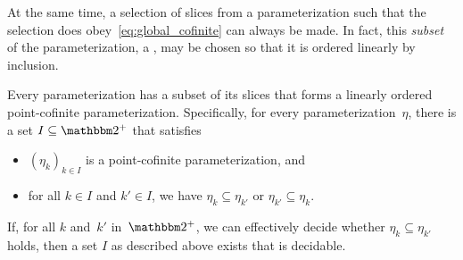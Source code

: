 At the same time, a selection of slices from a parameterization such that the selection does obey~\eqref{eq:global_cofinite} can always be made.
In fact, this \emph{subset} of the parameterization, a , may be chosen so that it is ordered linearly by inclusion.
\begin{lemma}
\label{lem:cofinal_chain}%
  Every parameterization has a subset of its slices that forms a linearly ordered point-cofinite parameterization.
  Specifically, for every parameterization~$\eta$, there is a set $I \subseteq \binary^+$ that satisfies
  \begin{itemize}
  \item $(\eta_k)_{k \in I}$ is a point-cofinite parameterization, and
  \item for all $k \in I$ and $k' \in I$, we have $\eta_k \subseteq \eta_{k'}$ or $\eta_{k'} \subseteq \eta_k$.
  \end{itemize}
  If, for all $k$ and~$k'$ in~$\binary^+$, we can effectively decide whether $\eta_k \subseteq \eta_{k'}$ holds, then a set $I$ as described above exists that is decidable.
\end{lemma}
